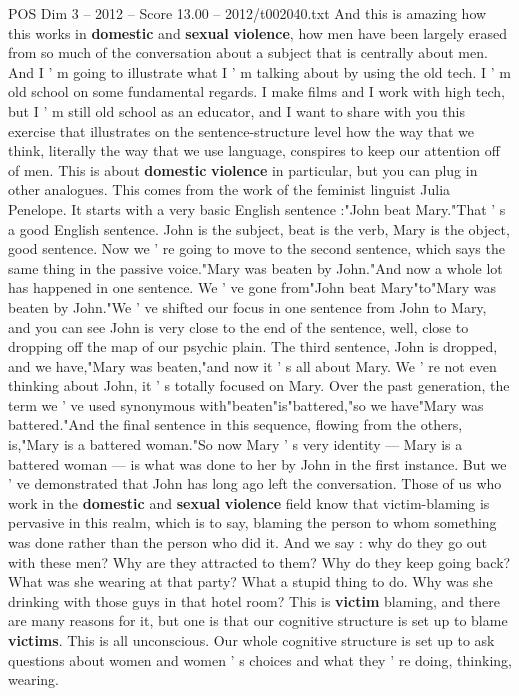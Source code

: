 \begin{textsample}{POS Dim 3 – 2012 – Score 13.00 – 2012/t002040.txt}
And this is amazing how this works in \textbf{domestic} and \textbf{sexual} \textbf{violence}, how men have been largely erased from so much of the conversation about a subject that is centrally about men.
And I ' m going to illustrate what I ' m talking about by using the old tech.
I ' m old school on some fundamental regards.
I make films and I work with high tech, but I ' m still old school as an educator, and I want to share with you this exercise that illustrates on the sentence-structure level how the way that we think, literally the way that we use language, conspires to keep our attention off of men.
This is about \textbf{domestic} \textbf{violence} in particular, but you can plug in other analogues.
This comes from the work of the feminist linguist Julia Penelope.
It starts with a very basic English sentence :"John beat Mary."That ' s a good English sentence.
John is the subject, beat is the verb, Mary is the object, good sentence.
Now we ' re going to move to the second sentence, which says the same thing in the passive voice."Mary was beaten by John."And now a whole lot has happened in one sentence.
We ' ve gone from"John beat Mary"to"Mary was beaten by John."We ' ve shifted our focus in one sentence from John to Mary, and you can see John is very close to the end of the sentence, well, close to dropping off the map of our psychic plain.
The third sentence, John is dropped, and we have,"Mary was beaten,"and now it ' s all about Mary.
We ' re not even thinking about John, it ' s totally focused on Mary.
Over the past generation, the term we ' ve used synonymous with"beaten"is"battered,"so we have"Mary was battered."And the final sentence in this sequence, flowing from the others, is,"Mary is a battered woman."So now Mary ' s very identity — Mary is a battered woman — is what was done to her by John in the first instance.
But we ' ve demonstrated that John has long ago left the conversation.
Those of us who work in the \textbf{domestic} and \textbf{sexual} \textbf{violence} field know that victim-blaming is pervasive in this realm, which is to say, blaming the person to whom something was done rather than the person who did it.
And we say : why do they go out with these men?
Why are they attracted to them?
Why do they keep going back?
What was she wearing at that party?
What a stupid thing to do.
Why was she drinking with those guys in that hotel room?
This is \textbf{victim} blaming, and there are many reasons for it, but one is that our cognitive structure is set up to blame \textbf{victims}.
This is all unconscious.
Our whole cognitive structure is set up to ask questions about women and women ' s choices and what they ' re doing, thinking, wearing.

\end{textsample}
